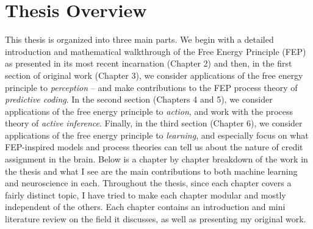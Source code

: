 \section{Thesis Overview}

This thesis is organized into three main parts. We begin with a detailed introduction and mathematical walkthrough of the Free Energy Principle (FEP) as presented in its most recent incarnation \citep{friston2019free,parr2020markov} (Chapter 2) and then, in the first section of original work (Chapter 3), we consider applications of the free energy principle to \emph{perception} -- and make contributions to the FEP process theory of \emph{predictive coding}. In the second section (Chapters 4 and 5), we consider applications of the free energy principle to \emph{action}, and work with the process theory of \emph{active inference}. Finally, in the third section (Chapter 6), we consider applications of the free energy principle to \emph{learning}, and especially focus on what FEP-inspired models and process theories can tell us about the nature of credit assignment in the brain. Below is a chapter by chapter breakdown of the work in the thesis and what I see are the main contributions to both machine learning and neuroscience in each. Throughout the thesis, since each chapter covers a fairly distinct topic, I have tried to make each chapter modular and mostly independent of the others. Each chapter contains an introduction and mini literature review on the field it discusses, as well as presenting my original work.





